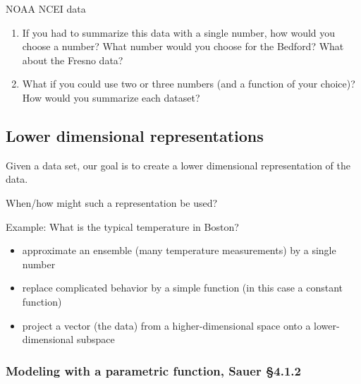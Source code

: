 \documentclass[12pt,letterpaper,noanswers]{exam}
\begin{document}
NOAA NCEI data

\begin{enumerate}[resume]
\item If you had to summarize this data with a single number, how would you choose a number?  What number would you choose for the Bedford? What about the Fresno data?


\item What if you could use two or three numbers (and a function of your choice)?  How would you summarize each dataset?
\end{enumerate}
\vspace{1cm}

\subsection{Lower dimensional representations}

Given a data set, our goal is to create a lower dimensional representation of the data.

When/how might such a representation be used?

Example: What is the typical temperature in Boston?

\begin{tcolorbox}
\begin{itemize}
\itemsep0pt
    \item approximate an ensemble (many temperature measurements) by a single number
    \item replace complicated behavior by a simple function (in this case a constant function)
    \item project a vector (the data) from a higher-dimensional space onto a lower-dimensional subspace
\end{itemize}
\end{tcolorbox}



\subsubsection{Modeling with a parametric function, Sauer \S 4.1.2}
\end{document}

